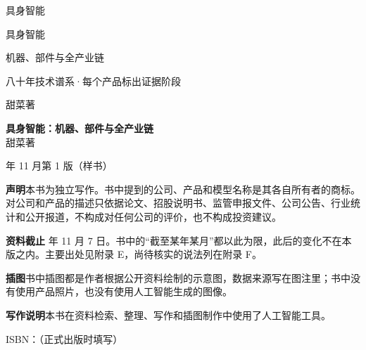 \thispagestyle{empty}
\vspace*{60mm}
\begin{center}
{\heitiblack\fontsize{30}{36}\selectfont 具身智能}
\end{center}
\cleardoublepage

\thispagestyle{empty}
\vspace*{38mm}
\begin{center}
{\heitiblack\fontsize{40}{48}\selectfont 具身智能}\par
\vspace{9mm}
{\heiti\Large 机器、部件与全产业链}\par
\vspace{4mm}
{\heiti\normalsize\color{mid} 八十年技术谱系\quad·\quad 每个产品标出证据阶段}\par
\vfill
{\heiti\Large 甜菜\quad 著}\par
\vspace{20mm}
\end{center}
\newpage

\thispagestyle{empty}
\vspace*{\fill}
{\small\setlength{\parskip}{1.2ex}\linespread{1.5}\selectfont
\noindent\textbf{具身智能：机器、部件与全产业链}\\
甜菜\quad 著

 年 11 月第 1 版（样书）

\noindent\textbf{声明}\quad 本书为独立写作。书中提到的公司、产品和模型名称是其各自所有者的商标。对公司和产品的描述只依据论文、招股说明书、监管申报文件、公司公告、行业统计和公开报道，不构成对任何公司的评价，也不构成投资建议。

\noindent\textbf{资料截止} 年 11 月 7 日。书中的“截至某年某月”都以此为限，此后的变化不在本版之内。主要出处见附录 E，尚待核实的说法列在附录 F。

\noindent\textbf{插图}\quad 书中插图都是作者根据公开资料绘制的示意图，数据来源写在图注里；书中没有使用产品照片，也没有使用人工智能生成的图像。

\noindent\textbf{写作说明}\quad 本书在资料检索、整理、写作和插图制作中使用了人工智能工具。

\noindent ISBN：（正式出版时填写）
\par}
\cleardoublepage
